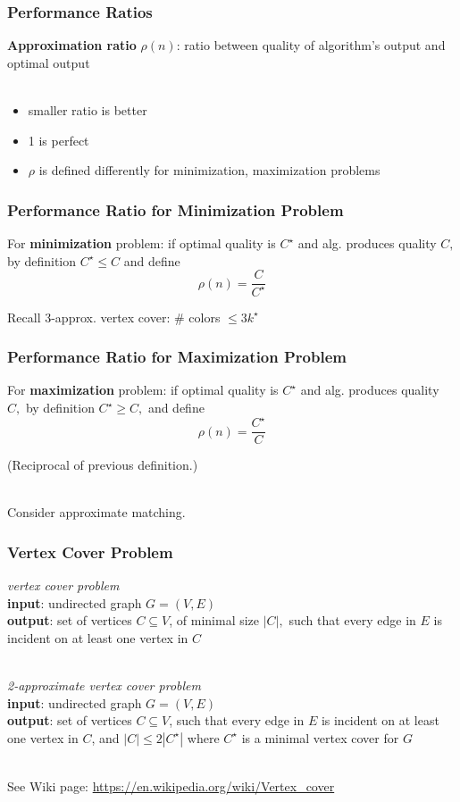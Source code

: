\documentclass{beamer}
\newcommand{\stanza}{ \\~\ }
\begin{document}
  \begin{frame} \frametitle{Performance Ratios}
  \textbf{Approximation ratio} $\rho(n)$: ratio between quality of algorithm's output
  and optimal output \stanza
  \begin{itemize}
    \item smaller ratio is better
    \item 1 is perfect
    \item $\rho$ is defined differently for minimization, maximization problems
  \end{itemize}
  \end{frame}
  
  \begin{frame} \frametitle{Performance Ratio for Minimization Problem}
    For \textbf{minimization} problem: if optimal quality is $C^\star$ and alg. produces
        quality $C,$ by definition $C^\star \leq C$ and define
        \[ \rho(n) = \frac{C}{C^\star} \]
    
    Recall 3-approx. vertex cover: \# colors $\leq 3 k^\star$
    \end{frame}
    
    \begin{frame} \frametitle{Performance Ratio for Maximization Problem}
  For \textbf{maximization} problem: if optimal quality is $C^\star$ and alg. produces
      quality $C,$ by definition $C^\star \geq C,$ and define
      \[ \rho(n) = \frac{C^\star}{C} \]
    
      (Reciprocal of previous definition.)
      \stanza
      
      Consider approximate matching.
  
    \end{frame}
    \begin{frame} \frametitle{Vertex Cover Problem}
      \emph{vertex cover problem} \\
      \textbf{input}: undirected graph $G=(V,E)$ \\
      \textbf{output}: set of vertices $C \subseteq V$, of minimal size $|C|,$ such
        that every edge in $E$ is incident on at least one vertex in $C$
       \stanza
      
       \emph{2-approximate vertex cover problem} \\
       \textbf{input}: undirected graph $G=(V,E)$ \\
       \textbf{output}: set of vertices $C \subseteq V$, such
         that every edge in $E$ is incident on at least one vertex in $C$, and
         $|C| \leq 2 |C^\star|$ where $C^\star$ is a minimal vertex cover for $G$
        \stanza
      
      See Wiki page: \url{https://en.wikipedia.org/wiki/Vertex_cover}
      \end{frame}
      
\end{document}
